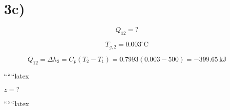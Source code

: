 

\section*{3c)}

\[
Q_{12} = ?
\]

\[
T_{g,2} = 0.003^\circ \text{C}
\]

\[
Q_{12} = \Delta h_2 = C_p (T_2 - T_1) = 0.7993 (0.003 - 500) = -399.65 \, \text{kJ}
\]

``````latex


\( z = ? \)

``````latex